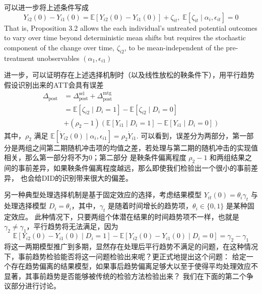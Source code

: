 \documentclass[../didNotes.tex]{subfiles}
\begin{document}
可以进一步将上述条件写成
$$
Y_{i 2}(0) - Y_{i 1}(0) = \mathbb{E}[Y_{i 2}(0) - Y_{i 1}(0)] + \zeta_{i t}, \; \mathbb{E}[\zeta_{i t} \mid
\alpha_{i},\epsilon_{i t}]=0
$$
That is, Proposition 3.2 allows the each individual's untreated potential outcomes to vary over time beyond
deterministic mean shifts but requires the stochastic component of the change over time, $\zeta_{i 2}$,
to be mean-independent of the pre-treatment unobservables $(\alpha_{1},\epsilon_{i 1})$

进一步，可以证明存在上述选择机制时（以及线性放松的鞅条件下），用平行趋势假设识别出来的ATT会具有误差
\begin{align*}
  \Delta_{\text{post}} &= \Delta_{\text{post}}^{\text{sel}} + \Delta_{\text{post}}^{\text{mtg}} \\
  &= \mathbb{E}[\zeta_{i 2} \mid D_{i}=1] - \mathbb{E}[\zeta_{i 2} \mid D_{i}=0] \\
  &+ (\rho_{2}-1) \left(\mathbb{E}[Y_{i 1} \mid D_{i}=1] - \mathbb{E}[Y_{i 1} \mid D_{i}=0]\right)
\end{align*}
其中，$\rho_{2}$ 满足 $\mathbb{E}[\dot{Y}_{i 2}(0) \mid \alpha_{i}, \epsilon_{i 1}]=\rho_{2} \dot{Y}_{i 1}$.
可以看到，误差分为两部分，第一部分是两组之间第二期随机冲击项的均值之差，若处理与第二期的随机冲击的实现值相关，那么第一部分将不为0；第二部分
是鞅条件偏离程度 $\rho_{2}-1$ 和两组结果之间的事前差异，如果鞅条件偏离程度越远，那么即使我们检验出一个很小的事前差异，
也会给DID的识别带来很大的偏差。

另一种典型处理选择机制是基于固定效应的选择，考虑结果模型 $Y_{i t}(0) = \theta_{i} \gamma_{t}$
与处理选择模型 $D_{i} = \theta_{i}$，其中，$\gamma_{t}$ 是随着时间增长的趋势项，$\theta_{i} \in \{ 0,1 \}$ 是某种固定效应。
此种情况下，只要两组个体潜在结果的时间趋势项不一样，也就是 $\gamma_{2} \neq \gamma_{1}$，平行趋势将无法满足，因为
$$
\mathbb{E}[Y_{i 2}(0) - Y_{i 1}(0) \mid D_{i}=1] - \mathbb{E}[Y_{i 2}(0) - Y_{i 1}(0) \mid D_{i}=0] =
\gamma_{2} - \gamma_{1}
$$
将这一两期模型推广到多期，显然存在处理后平行趋势不满足的问题，在这种情况下，事前趋势检验能否将这一问题检验出来呢？更正式地提出这个问题：
给定一个存在趋势偏离的结果模型，如果事后趋势偏离足够大以至于使得平均处理效应不显著，其事前趋势是否能够被传统的检验方法检验出来？
我们在下面的第二个争议部分进行讨论。
\end{document}
